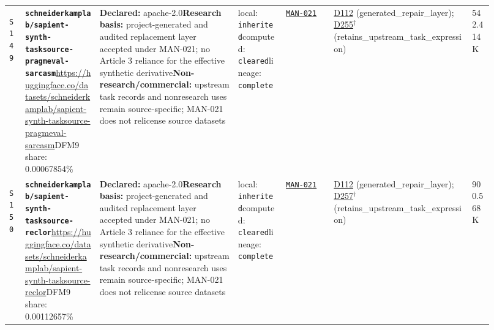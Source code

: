 \documentclass[9pt,a4paper]{article}
\newcommand{\srcid}[1]{\hypertarget{src:#1}{\texttt{#1}}}
\begin{document}
\begin{landscape}
\begin{longtable}{@{}L{0.03\linewidth}L{0.14\linewidth}L{0.26\linewidth}L{0.09\linewidth}L{0.09\linewidth}L{0.265\linewidth}L{0.045\linewidth}@{}}
\srcid{S149} & \textbf{\nolinkurl{schneiderkamplab/sapient-synth-tasksource-pragmeval-sarcasm}}\newline \url{https://huggingface.co/datasets/schneiderkamplab/sapient-synth-tasksource-pragmeval-sarcasm}\newline DFM9 share: 0.00067854\% & \textbf{Declared:} apache-2.0\newline \textbf{Research basis:} project-generated and audited replacement layer accepted under MAN-021; no Article 3 reliance for the effective synthetic derivative\newline \textbf{Non-research/commercial:} upstream task records and nonresearch uses remain source-specific; MAN-021 does not relicense source datasets & local: \texttt{inherited}\newline computed: \texttt{cleared}\newline lineage: \texttt{complete} & \hyperlink{manual:MAN-021}{\texttt{MAN-021}} & \hyperlink{dep:D112}{D112} (generated\_repair\_layer); \hyperlink{dep:D255}{D255}$^{\dagger}$ (retains\_upstream\_task\_expression) & 542.414K \\
\srcid{S150} & \textbf{\nolinkurl{schneiderkamplab/sapient-synth-tasksource-reclor}}\newline \url{https://huggingface.co/datasets/schneiderkamplab/sapient-synth-tasksource-reclor}\newline DFM9 share: 0.00112657\% & \textbf{Declared:} apache-2.0\newline \textbf{Research basis:} project-generated and audited replacement layer accepted under MAN-021; no Article 3 reliance for the effective synthetic derivative\newline \textbf{Non-research/commercial:} upstream task records and nonresearch uses remain source-specific; MAN-021 does not relicense source datasets & local: \texttt{inherited}\newline computed: \texttt{cleared}\newline lineage: \texttt{complete} & \hyperlink{manual:MAN-021}{\texttt{MAN-021}} & \hyperlink{dep:D112}{D112} (generated\_repair\_layer); \hyperlink{dep:D257}{D257}$^{\dagger}$ (retains\_upstream\_task\_expression) & 900.568K \\

\end{longtable}
\end{landscape}
\end{document}
